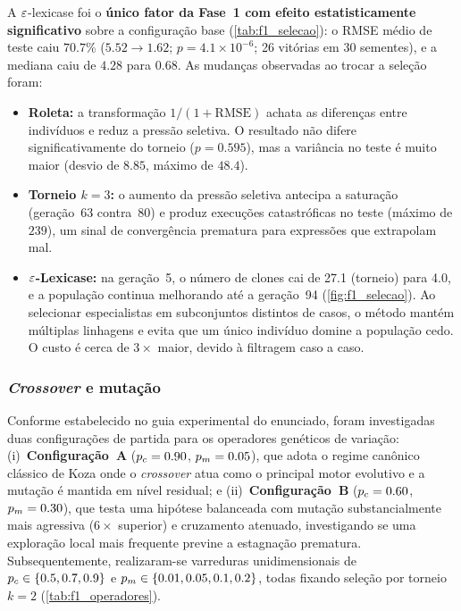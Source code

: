A $\varepsilon$-lexicase foi o \textbf{único fator da Fase~1 com efeito
estatisticamente significativo} sobre a configuração base
(\cref{tab:f1_selecao}): o RMSE médio de teste caiu $70.7\%$
($5.52\to1.62$; $p=4.1\times10^{-6}$; 26 vitórias em 30 sementes), e a mediana
caiu de $4.28$ para $0.68$. As mudanças observadas ao trocar a seleção foram:

\begin{itemize}
  \item \textbf{Roleta:} a transformação $1/(1+\mathrm{RMSE})$ achata as
        diferenças entre indivíduos e reduz a pressão seletiva. O resultado
        não difere significativamente do torneio ($p=0.595$), mas a
        variância no teste é muito maior (desvio de $8.85$, máximo de
        $48.4$).
  \item \textbf{Torneio $k=3$:} o aumento da pressão seletiva antecipa a
        saturação (geração~63 contra~80) e produz execuções catastróficas no
        teste (máximo de $239$), um sinal de convergência prematura para
        expressões que extrapolam mal.
  \item \textbf{$\varepsilon$-Lexicase:} na geração~5, o número de clones cai de
        27.1 (torneio) para 4.0, e a população continua melhorando até a
        geração~94 (\cref{fig:f1_selecao}). Ao selecionar especialistas em
        subconjuntos distintos de casos, o método mantém múltiplas
        linhagens e evita que um único indivíduo domine a população cedo.
        O custo é cerca de $3\times$ maior, devido à filtragem caso a caso.
\end{itemize}

\subsubsection{\emph{Crossover} e mutação}
\label{sec:f1_operadores}

Conforme estabelecido no guia experimental do enunciado, foram investigadas duas
configurações de partida para os operadores genéticos de variação:
(i)~\textbf{Configuração~A} ($p_c=0.90$, $p_m=0.05$), que adota o regime
canônico clássico de Koza onde o \emph{crossover} atua como o principal motor
evolutivo e a mutação é mantida em nível residual; e
(ii)~\textbf{Configuração~B} ($p_c=0.60$, $p_m=0.30$), que testa uma hipótese
balanceada com mutação substancialmente mais agressiva ($6\times$ superior) e
cruzamento atenuado, investigando se uma exploração local mais frequente previne
a estagnação prematura. Subsequentemente, realizaram-se varreduras
unidimensionais de $p_c\in\{0.5,0.7,0.9\}$ e $p_m\in\{0.01,0.05,0.1,0.2\}$,
todas fixando seleção por torneio $k=2$ (\cref{tab:f1_operadores}).

